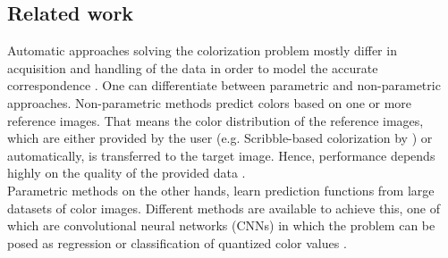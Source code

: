 \documentclass[12pt,letterpaper]{article}
\begin{document}
\subsection{Related work}
Automatic approaches solving the colorization problem mostly differ in acquisition and handling of the data in order to model the accurate correspondence \citep{Zhang.2016}. One can differentiate between parametric and non-parametric approaches. Non-parametric methods predict colors based on one or more reference images. That means the color distribution of the reference images, which are either provided by the user (e.g. Scribble-based colorization by \cite{Levin.2004}) or automatically, is transferred to the target image. Hence, performance depends highly on the quality of the provided data  \citep{Cheng_2015}.\\
Parametric methods on the other hands, learn prediction functions from large datasets of color images. Different methods are available to achieve this, one of which are convolutional neural networks (CNNs) in which the problem can be posed as regression or classification of quantized color values \citep{Zhang.2016}.
\end{document}

